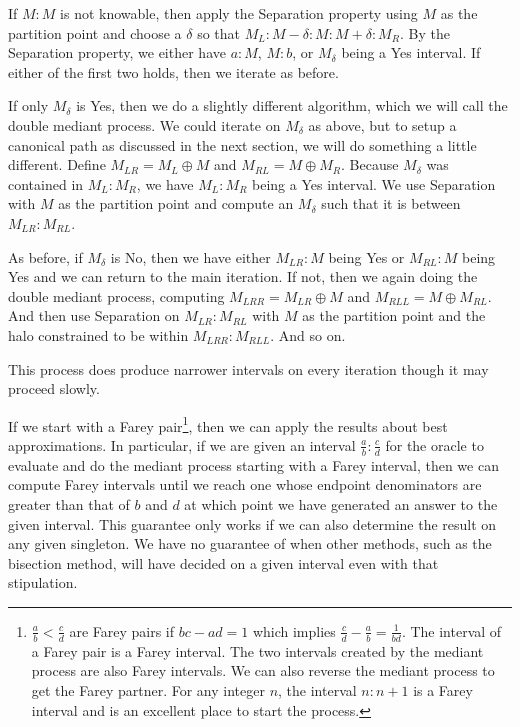 \documentclass[12pt]{article}
\begin{document}
If $M:M$ is not knowable, then apply the Separation property using $M$ as the partition point and choose a $\delta$ so that $M_L : M-\delta : M : M+\delta : M_R$. By the Separation property, we either have $a:M$, $M:b$, or $M_\delta$ being a Yes interval. If either of the first two holds, then we iterate as before. 

If only $M_\delta$ is Yes, then we do a slightly different algorithm, which we will call the double mediant process. We could iterate on $M_\delta$ as above, but to setup a canonical path as discussed in the next section, we will do something a little different. Define $M_{LR} = M_L \oplus M$ and $M_{RL} = M \oplus M_{R}$. Because $M_\delta$ was contained in $M_L:M_R$, we have $M_L:M_R$ being a Yes interval. We use Separation with $M$ as the partition point and compute an $M_\delta$ such that it is between $M_{LR}:M_{RL}$. 

As before, if $M_\delta$ is No, then we have either $M_{LR}:M$ being Yes or $M_{RL}:M$ being Yes and we can return to the main iteration. If not, then we again doing the double mediant process, computing $M_{LRR} = M_{LR} \oplus M$ and $M_{RLL} = M \oplus M_{RL}$. And then use Separation on $M_{LR}:M_{RL}$ with $M$ as the partition point and the halo constrained to be within $M_{LRR}:M_{RLL}$. And so on. 

This process does produce narrower intervals on every iteration though it may proceed slowly. 

If we start with a Farey pair\footnote{$\frac{a}{b} < \frac{c}{d}$ are Farey pairs if $bc-ad=1$ which implies $\frac{c}{d} - \frac{a}{b} = \frac{1}{bd}$. The interval of a Farey pair is a Farey interval. The two intervals created by the mediant process are also Farey intervals. We can also reverse the mediant process to get the Farey partner. For any integer $n$, the interval $n:n+1$ is a Farey interval and is an excellent place to start the process.}, then we can apply the results about best approximations. In particular, if we are given an interval $\frac{a}{b} : \frac{c}{d}$ for the oracle to evaluate and do the mediant process starting with a Farey interval, then we can compute Farey intervals until we reach one whose endpoint denominators are greater than that of $b$ and $d$ at which point we have generated an answer to the given interval. This guarantee only works if we can also determine the result on any given singleton. We have no guarantee of when other methods, such as the bisection method, will have decided on a given interval even with that stipulation. 
\end{document}
